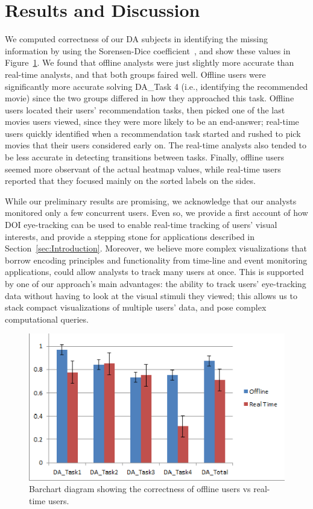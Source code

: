 ﻿\section{Results and Discussion}
We computed correctness of our DA subjects in identifying the missing information by using the Sorensen-Dice coefficient~\cite{sorensen1948method}, and show these values in Figure~\ref{fig:barchart}. We found that offline analysts were just slightly more accurate than real-time analysts, and that both groups faired well. Offline users were significantly more accurate solving DA\_Task 4 (i.e., identifying the recommended movie) since the two groups differed in how they approached this task. Offline users located their users' recommendation tasks, then picked one of the last movies users viewed, since they were more likely to be an end-answer; real-time users quickly identified when a recommendation task started and rushed to pick movies that their users considered early on. The real-time analysts also tended to be less accurate in detecting transitions between tasks. Finally, offline users seemed more observant of the actual heatmap values, while real-time users reported that they focused mainly on the sorted labels on the sides. 

While our preliminary results are promising, we acknowledge that our analysts monitored only a few concurrent users. Even so, we provide a first account of how DOI eye-tracking can be used to enable real-time tracking of users' visual interests, and provide a stepping stone for applications described in Section~\ref{sec:Introduction}.  Moreover, we believe more complex visualizations that borrow encoding principles and functionality from time-line and event monitoring applications, could allow analysts to track many users at once. This is supported by one of our approach's main advantages: the ability to track users' eye-tracking data without having to look at the visual stimuli they viewed; this allows us to stack compact visualizations of multiple users' data, and pose complex computational queries.  



\begin{figure}[htb]
  \centering
  \includegraphics[width=0.9\linewidth]{images/barchart.eps}
  \caption{Barchart diagram showing the correctness of offline users vs real-time users.}
	\label{fig:barchart}
\end{figure} 

